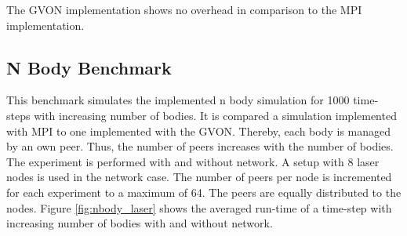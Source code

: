 The GVON implementation shows no overhead in comparison to the MPI
implementation. 


\subsection{N Body Benchmark}
This benchmark simulates the implemented n body simulation for 1000
time-steps with increasing number of bodies. It is compared a
simulation implemented with MPI to one implemented with the GVON.
Thereby, each body is managed by an own peer. Thus, the number of
peers increases with the number of bodies. The experiment is performed
with and without network. A setup with 8 laser nodes is used in the
network case. The number of peers per node is incremented for each
experiment to a maximum of 64. The peers are equally distributed to
the nodes.  Figure \ref{fig:nbody_laser} shows the averaged run-time
of a time-step with increasing number of bodies with and without
network.

